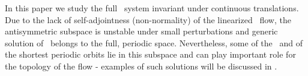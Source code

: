 In this paper we study the full \KS\ system invariant
under continuous translations. Due to the lack of self-adjointness
(non-normality) of the linearized \KS\ flow, 
the antisymmetric subspace
is unstable under small perturbations and generic solution of 
\KSe\ belongs to the full, periodic space. Nevertheless, some of
the \eqva\ and of the shortest periodic orbits lie in this subspace
and can play important role for the topology of the flow - examples
of such solutions will be discussed in .
